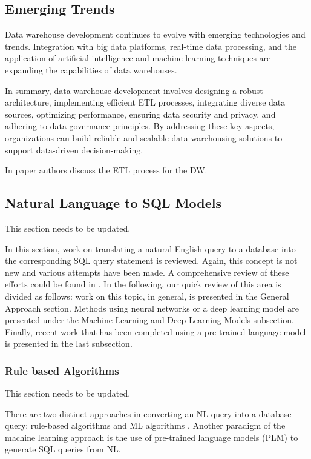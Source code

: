 \documentclass[conference]{IEEEtran}
\begin{document}
\subsection{Emerging Trends} Data warehouse development continues to evolve with emerging technologies and trends. Integration with big data platforms, real-time data processing, and the application of artificial intelligence and machine learning techniques are expanding the capabilities of data warehouses.

In summary, data warehouse development involves designing a robust architecture, implementing efficient ETL processes, integrating diverse data sources, optimizing performance, ensuring data security and privacy, and adhering to data governance principles. By addressing these key aspects, organizations can build reliable and scalable data warehousing solutions to support data-driven decision-making.



    
\bigskip


In paper \cite{Al-RahmanWebETL2023} authors discuss the ETL process for the DW.

\subsection{Natural Language to SQL Models}

This section needs to be updated.

In this section, work on translating a natural English query to a database into the corresponding SQL query statement is reviewed. Again, this concept is not new and various attempts have been made. A comprehensive review of these efforts could be found in \cite{Wong2021ASystems}. In the following, our quick review of this area is divided as follows: work on this topic, in general, is presented in the General Approach section. Methods using neural networks or a deep learning model are presented under the Machine Learning and Deep Learning Models subsection. Finally, recent work that has been completed using a pre-trained language model is presented in the last subsection.

\subsubsection{Rule based Algorithms}

This section needs to be updated.

There are two distinct approaches in converting an NL query into a database query: rule-based algorithms and ML algorithms \cite{Wong2021ASystems}. Another paradigm of the machine learning approach is the use of pre-trained language models (PLM) to generate SQL queries from NL. 
\end{document}

